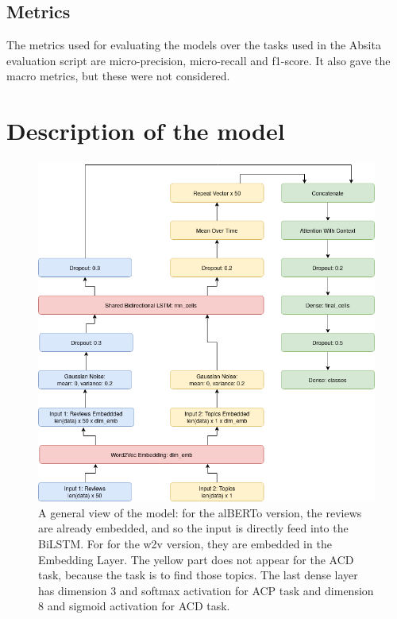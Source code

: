 \documentclass{article}
\begin{document}
        \subsection{Metrics}\label{subsec:metrics}
        The metrics used for evaluating the models over the tasks used in the Absita evaluation script are micro-precision, micro-recall and f1-score.
        It also gave the macro metrics, but these were not considered.

    \section{Description of the model}\label{sec:s3}
        \begin{figure}
            \includegraphics[width=\linewidth]{imgs/model.png}
            \caption{A general view of the model: for the alBERTo version, the reviews are already embedded, and so the input is directly feed into the BiLSTM.
            For for the w2v version, they are embedded in the Embedding Layer.
            The yellow part does not appear for the ACD task, because the task is to find those topics.
            The last dense layer has dimension 3 and softmax activation for ACP task and dimension 8 and sigmoid activation for ACD task.}
            \label{fig:model}
        \end{figure}
\end{document}
